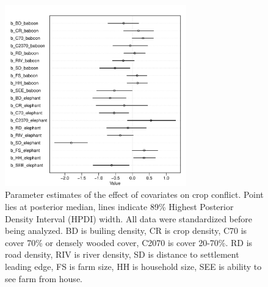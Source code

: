 \documentclass[12pt,]{article}
\begin{document}
\begin{figure}[H]
    \centering
    \includegraphics[width=0.7\textwidth]{Figures/crop_conflict_species_parameter_dotplots.pdf} %
    \caption{Parameter estimates of the effect of covariates on crop conflict. Point lies at posterior median, lines indicate 89\% Highest Posterior Density Interval (HPDI) width. All data were standardized before being analyzed. BD is builing density, CR is crop density, C70 is cover 70\% or densely wooded cover, C2070 is cover 20-70\%. RD is road density, RIV is river density, SD is distance to settlement leading edge, FS is farm size, HH is household size, SEE is ability to see farm from house.  }
    \label{fig:cropmodeldot}
\end{figure}
\end{document}
